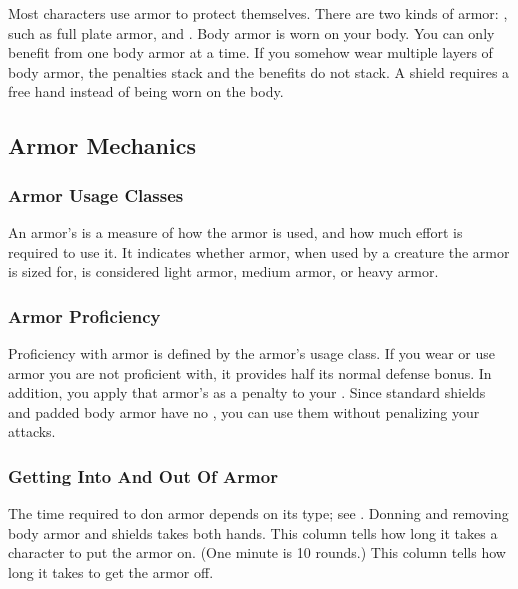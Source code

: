       

\newpage
{}

  Most characters use armor to protect themselves. There are two kinds of armor: , such as full plate armor, and .
  Body armor is worn on your body.
  You can only benefit from one body armor at a time.
  If you somehow wear multiple layers of body armor, the penalties stack and the benefits do not stack.
  A shield requires a free hand instead of being worn on the body.

  \subsection{Armor Mechanics}

    \subsubsection{Armor Usage Classes}\label{Armor Usage Classes}
      An armor's  is a measure of how the armor is used, and how much effort is required to use it.
      It indicates whether armor, when used by a creature the armor is sized for, is considered light armor, medium armor, or heavy armor.

    \subsubsection{Armor Proficiency}\label{Armor Proficiency}
      Proficiency with armor is defined by the armor's usage class.
      If you wear or use armor you are not proficient with, it provides half its normal defense bonus.
      In addition, you apply that armor's  as a penalty to your .
      Since standard shields and padded body armor have no , you can use them without penalizing your attacks.

    \subsubsection{Getting Into And Out Of Armor}
      The time required to don armor depends on its type; see . Donning and removing body armor and shields takes both hands.
       This column tells how long it takes a character to put the armor on. (One minute is 10 rounds.)
       This column tells how long it takes to get the armor off.

